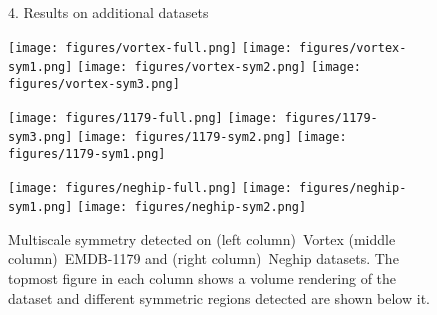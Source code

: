 \documentclass[review,journal]{vgtc}         %
\begin{document}
\begin{figure*}
\centering
{\sffamily\large{4. Results on additional datasets\\}}
\vspace{0.5cm}
\centering
\begin{minipage}{0.33\textwidth}
	\centering
	\subfigure
	{
		\texttt{[image: figures/vortex-full.png]}
	}
	\subfigure
	{
		\texttt{[image: figures/vortex-sym1.png]}
	}
	\subfigure
	{
		\texttt{[image: figures/vortex-sym2.png]}
	}
	\subfigure
	{
		\texttt{[image: figures/vortex-sym3.png]}
	}
\end{minipage}
\begin{minipage}{0.33\textwidth}
	\centering
	\subfigure
	{
		\texttt{[image: figures/1179-full.png]}
	}
	\subfigure
	{
		\texttt{[image: figures/1179-sym3.png]}
	}
	\subfigure
	{
		\texttt{[image: figures/1179-sym2.png]}
	}
	\subfigure
	{
		\texttt{[image: figures/1179-sym1.png]}
	}
\end{minipage}
\begin{minipage}{0.33\textwidth}
	\subfigure
	{
		\texttt{[image: figures/neghip-full.png]}
	}
	\subfigure
	{
		\texttt{[image: figures/neghip-sym1.png]}
	}
	\subfigure
	{
		\texttt{[image: figures/neghip-sym2.png]}
	}
\end{minipage}
\caption{\label{addres}Multiscale symmetry detected on (left column)~Vortex (middle column)~EMDB-1179 and (right column)~Neghip datasets.
	The topmost figure in each column shows a volume rendering of the dataset and different symmetric regions detected
are shown below it.}
\end{figure*}
\end{document}
